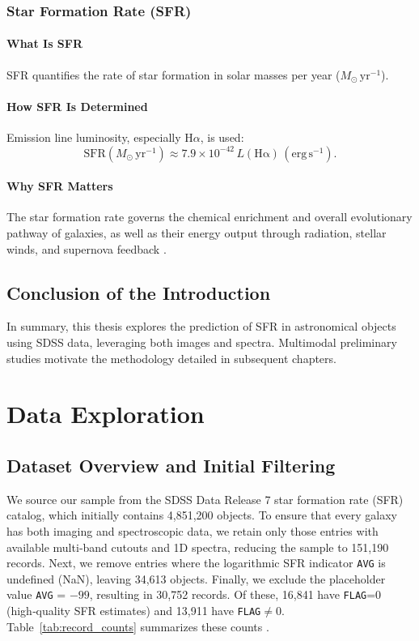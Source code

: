 \documentclass[english,bachelor,oneside]{ctufit-thesis}
\begin{document}
\subsection{Star Formation Rate (SFR)}

\subsubsection{What Is SFR}
SFR quantifies the rate of star formation in solar masses per year ($M_{\odot}\,\mathrm{yr}^{-1}$).

\subsubsection{How SFR Is Determined}
Emission line luminosity, especially H$\alpha$, is used:
\[
  \mathrm{SFR}(M_{\odot}\,\mathrm{yr}^{-1}) \approx 7.9 \times 10^{-42}\, L(\mathrm{H\alpha})\,(\mathrm{erg\,s}^{-1}).
\]
\cite{kennicutt1998star}

\subsubsection{Why SFR Matters}
The star formation rate governs the chemical enrichment and overall evolutionary pathway of galaxies, as well as their energy output through radiation, stellar winds, and supernova feedback \citep{234Class72:online}.


\section{Conclusion of the Introduction}

In summary, this thesis explores the prediction of SFR in astronomical objects using SDSS data, leveraging both images and spectra. Multimodal preliminary studies motivate the methodology detailed in subsequent chapters.

\newpage

\chapter{Data Exploration}
\label{ch:data_exploration}

\section{Dataset Overview and Initial Filtering}
We source our sample from the SDSS Data Release 7 star formation rate (SFR) catalog, which initially contains 4,851,200 objects. To ensure that every galaxy has both imaging and spectroscopic data, we retain only those entries with available multi‑band cutouts and 1D spectra, reducing the sample to 151,190 records. Next, we remove entries where the logarithmic SFR indicator \texttt{AVG} is undefined (NaN), leaving 34,613 objects. Finally, we exclude the placeholder value \texttt{AVG} = $-99$, resulting in 30,752 records. Of these, 16,841 have \texttt{FLAG}=0 (high‑quality SFR estimates) \cite{SDSS_SFR_DOC} and 13,911 have \texttt{FLAG}$\neq$0. Table~\ref{tab:record_counts} summarizes these counts \cite{data_exploring}.
\end{document}
